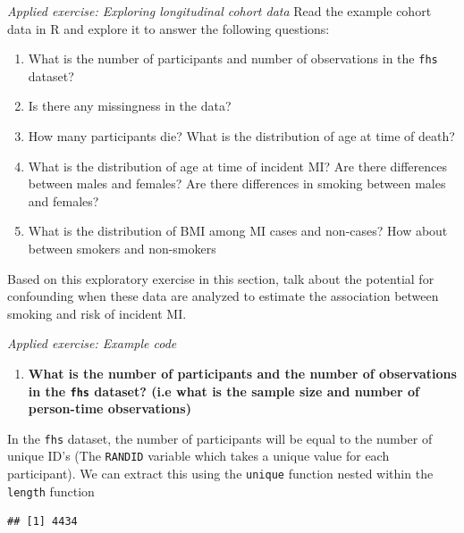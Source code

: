 \documentclass[
]{book}
\newenvironment{Shaded}{\begin{snugshade}}{\end{snugshade}}
\newcommand{\KeywordTok}[1]{\textcolor[rgb]{0.13,0.29,0.53}{\textbf{#1}}}
\newcommand{\NormalTok}[1]{#1}
\newcommand{\OperatorTok}[1]{\textcolor[rgb]{0.81,0.36,0.00}{\textbf{#1}}}
\providecommand{\tightlist}{%
  \setlength{\itemsep}{0pt}\setlength{\parskip}{0pt}}
\begin{document}
\emph{Applied exercise: Exploring longitudinal cohort data}
Read the example cohort data in R and explore it to answer the following
questions:

\begin{enumerate}
\def\labelenumi{\arabic{enumi}.}
\tightlist
\item
  What is the number of participants and number of observations in the \texttt{fhs} dataset?
\item
  Is there any missingness in the data?
\item
  How many participants die? What is the distribution of age at time of death?
\item
  What is the distribution of age at time of incident MI? Are there differences between males and females? Are there differences in smoking between males and females?
\item
  What is the distribution of BMI among MI cases and non-cases? How about between smokers and non-smokers
\end{enumerate}

Based on this exploratory exercise in this section, talk about the potential
for confounding when these data are analyzed to estimate the association between
smoking and risk of incident MI.

\emph{Applied exercise: Example code}

\begin{enumerate}
\def\labelenumi{\arabic{enumi}.}
\tightlist
\item
  \textbf{What is the number of participants and the number of observations in the \texttt{fhs} dataset? (i.e what is the sample size and number of person-time observations)}
\end{enumerate}

In the \texttt{fhs} dataset, the number of participants will be equal to the number of unique ID's (The \texttt{RANDID} variable which takes a unique value for each participant). We can extract this using the \texttt{unique} function nested within the \texttt{length} function

\begin{Shaded}
\end{Shaded}

\begin{verbatim}
## [1] 4434
\end{verbatim}
\end{document}
